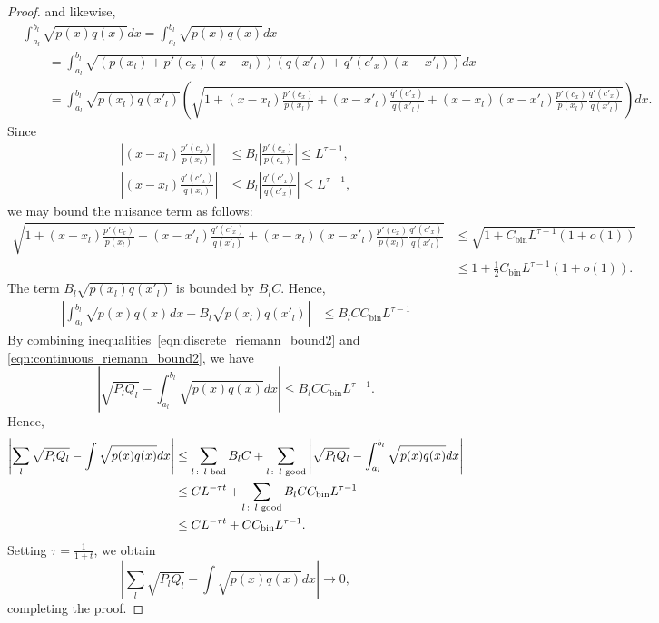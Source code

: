 \documentclass{article}
\newcommand{\bin}{\text{bin}}
\begin{document}
\begin{proof}
and likewise,
\begin{align*}
& \int_{a_l}^{b_l} \sqrt{p(x) q(x)}dx = \int_{a_l}^{b_l} \sqrt{p(x) q(x)} dx \\
                      & \qquad = \int_{a_l}^{b_l} \sqrt{ (p(x_l) + p'(c_x)(x - x_l))
                                      (q(x'_l) + q'(c'_x)(x - x'_l)) } dx \\
    & \qquad =\int_{a_l}^{b_l} \sqrt{ p(x_l) q(x'_l)} \left(
              \sqrt{ 1+ (x - x_l) \frac{p'(c_x)}{p(x_l)} + (x - x'_l) \frac{q'(c'_x)}{q(x'_l)} 
                     + (x - x_l)(x - x'_l) \frac{p'(c_x)}{p(x_l)} \frac{q'(c'_x)}{q(x'_l)} } \right) dx. 
\end{align*}
Since
\begin{align*}
\left| (x - x_l) \frac{p'(c_x)}{p(x_l)} \right| & \leq B_l \left| \frac{ p'(c_x)}{p(c_x)} \right| \leq L^{\tau - 1}, \\
%
\left| (x - x_l) \frac{q'(c'_x)}{q(x_l)} \right| & \leq B_l \left| \frac{ q'(c'_x)}{q(c'_x)} \right| \leq L^{\tau - 1},
\end{align*}
we may bound the nuisance term as follows:
\begin{align*}
 \sqrt{ 1+ (x - x_l) \frac{p'(c_x)}{p(x_l)} + (x - x'_l) \frac{q'(c'_x)}{q(x'_l)} 
                     + (x - x_l)(x - x'_l) \frac{p'(c_x)}{p(x_l)} \frac{q'(c'_x)}{q(x'_l)} } 
    &\leq \sqrt{ 1 + C_\bin L^{\tau - 1} (1 + o(1)) } \\
    &\leq 1 + \frac{1}{2} C_\bin L^{\tau - 1} (1 + o(1)). 
\end{align*}
The term $B_l \sqrt{p(x_l)q(x'_l)}$ is bounded by $B_l C$. Hence,
\begin{align}
\label{eqn:continuous_riemann_bound2}
\left| \int_{a_l}^{b_l} \sqrt{p(x) q(x)}dx - B_l \sqrt{p(x_l) q(x'_l)} \right| &\leq B_l C C_\bin L^{\tau - 1}
\end{align}
By combining inequalities~\eqref{eqn:discrete_riemann_bound2} and \eqref{eqn:continuous_riemann_bound2}, we have
\[
\left| \sqrt{P_l Q_l} - \int_{a_l}^{b_l} \sqrt{p(x) q(x)} dx \right| \leq B_l C C_\bin L^{\tau - 1}.
\]
Hence,
\begin{align*}
\left| \sum_l \sqrt{P_l Q_l} - \int \sqrt{p(x) q(x)} dx \right| &\leq
   \sum_{l \,:\, \trm{ $l$ bad}} B_l C + 
   \sum_{l \,:\, \trm{ $l$ good}} \left| \sqrt{P_l Q_l} - \int_{a_l}^{b_l} \sqrt{ p(x) q(x)} dx \right| \\
  & \leq C L^{ - \tau t} + \sum_{l \,:\, \trm{ $l$ good}} B_l C C_\bin L^{\tau - 1} \\
  & \leq  C L^{ - \tau t} + C C_\bin L^{\tau - 1}.
\end{align*}
Setting $\tau = \frac{1}{1+t}$, we obtain
\[
\left| \sum_l \sqrt{P_l Q_l} - \int \sqrt{p(x) q(x)} dx \right| \rightarrow 0,
\]
completing the proof.
\end{proof}
\end{document}
